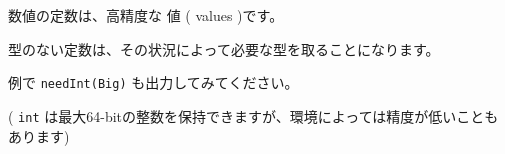 数値の定数は、高精度な 値 ( values )です。

型のない定数は、その状況によって必要な型を取ることになります。

例で \texttt{needInt(Big)} も出力してみてください。

( \texttt{int} は最大64-bitの整数を保持できますが、環境によっては精度が低いこともあります)